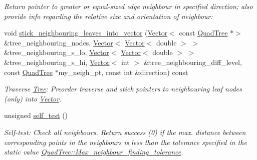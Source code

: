 \begin{DoxyCompactItemize}
\begin{DoxyCompactList}\small\item\em Return pointer to greater or equal-\/sized edge neighbour in specified {\ttfamily direction}; also provide info regarding the relative size and orientation of neighbour\+: \end{DoxyCompactList}\item 
void \hyperlink{classoomph_1_1QuadTree_a34650b024e8d355a117f486d18ab2062}{stick\+\_\+neighbouring\+\_\+leaves\+\_\+into\+\_\+vector} (\hyperlink{classoomph_1_1Vector}{Vector}$<$ const \hyperlink{classoomph_1_1QuadTree}{Quad\+Tree} $\ast$$>$ \&tree\+\_\+neighbouring\+\_\+nodes, \hyperlink{classoomph_1_1Vector}{Vector}$<$ \hyperlink{classoomph_1_1Vector}{Vector}$<$ double $>$ $>$ \&tree\+\_\+neighbouring\+\_\+s\+\_\+lo, \hyperlink{classoomph_1_1Vector}{Vector}$<$ \hyperlink{classoomph_1_1Vector}{Vector}$<$ double $>$ $>$ \&tree\+\_\+neighbouring\+\_\+s\+\_\+hi, \hyperlink{classoomph_1_1Vector}{Vector}$<$ int $>$ \&tree\+\_\+neighbouring\+\_\+diff\+\_\+level, const \hyperlink{classoomph_1_1QuadTree}{Quad\+Tree} $\ast$my\+\_\+neigh\+\_\+pt, const int \&direction) const
\begin{DoxyCompactList}\small\item\em Traverse \hyperlink{classoomph_1_1Tree}{Tree}\+: Preorder traverse and stick pointers to neighbouring leaf nodes (only) into \hyperlink{classoomph_1_1Vector}{Vector}. \end{DoxyCompactList}\item 
unsigned \hyperlink{classoomph_1_1QuadTree_aa8bb42eac81f1b1b8bc7eb3e82fc5e29}{self\+\_\+test} ()
\begin{DoxyCompactList}\small\item\em Self-\/test\+: Check all neighbours. Return success (0) if the max. distance between corresponding points in the neighbours is less than the tolerance specified in the static value \hyperlink{classoomph_1_1Tree_aef9abebc166fa3bf81ecb59ec0d5d6b2}{Quad\+Tree\+::\+Max\+\_\+neighbour\+\_\+finding\+\_\+tolerance}. \end{DoxyCompactList}\end{DoxyCompactItemize}
